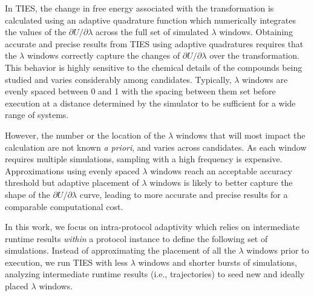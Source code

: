 
In TIES, the change in free energy associated with the transformation is
calculated using an adaptive quadrature function which numerically integrates
the values of the $\partial U/\partial\lambda$ across the full set of
simulated $\lambda$ windows. Obtaining accurate and precise results from TIES
using adaptive quadratures requires that the $\lambda$ windows correctly
capture the changes of $\partial U/\partial\lambda$ over the transformation.
This behavior is highly sensitive to the chemical details of the compounds
being studied and varies considerably among candidates. Typically, $\lambda$
windows are evenly spaced between 0 and 1 with the spacing between them set
before execution at a distance determined by the simulator to be sufficient
for a wide range of systems.

However, the number or the location of the $\lambda$ windows that will most
impact the calculation are not known \textit{a priori}, and varies across
candidates. As each window requires multiple simulations, sampling with a
high frequency is expensive. Approximations using evenly spaced $\lambda$
windows reach an acceptable accuracy threshold but adaptive placement of
$\lambda$ windows is likely to better capture the shape of the $\partial
U/\partial\lambda$ curve, leading to more accurate and precise results for a
comparable computational cost.


In this work, we focus on intra-protocol adaptivity
which relies on intermediate runtime results \textit{within} a protocol
instance to define the following set of simulations. Instead of approximating
the placement of all the $\lambda$ windows prior to execution, we run TIES
with less $\lambda$ windows and shorter bursts of simulations, analyzing
intermediate runtime results (i.e., trajectories) to seed new and ideally
placed $\lambda$ windows.